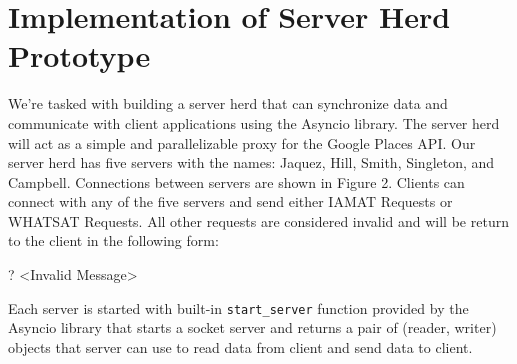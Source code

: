 \section{Implementation of Server Herd Prototype}
We're tasked with building a server herd that can synchronize data and communicate with client applications using the Asyncio library. The server herd will act as a simple and parallelizable proxy for the Google Places API. Our server herd has five servers with the names: Jaquez, Hill, Smith, Singleton, and Campbell. Connections between servers are shown in Figure 2. Clients can connect with any of the five servers and send either IAMAT Requests or WHATSAT Requests. All other requests are considered invalid and will be return to the client in the following form:
\begin{center}
    ? <Invalid Message>
\end{center}
Each server is started with built-in \texttt{start\_server} function provided by the Asyncio library that starts a socket server and returns a pair of (reader, writer) objects that server can use to read data from client and send data to client.

